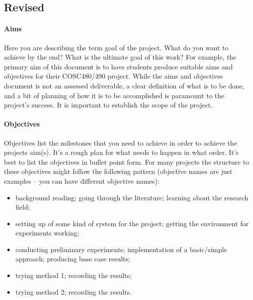 \documentclass[12pt]{article}
\begin{document}
\subsection*{Revised}

\paragraph{Aims}
Here you are describing the term goal of the project. What do you want to achieve by the end?  What is the ultimate goal of this work?  For example, the primary aim of this document is to have students produce suitable aims and objectives for their COSC480/490 project. While the aims and objectives document is not an assessed deliverable, a clear definition of what is to be done, and a bit of planning of how it is to be accomplished is paramount to the project's success. It is important to establish the scope of the project.

\paragraph{Objectives}
Objectives list the milestones that you need to achieve in order to achieve the projects aim(s). It's a rough plan for what needs to happen in what order. It's best to list the objectives in bullet point form. For many projects the structure to these objectives might follow the following pattern (objective names are just examples -- you can have different objective names):    
\begin{itemize}[noitemsep]
\item background reading; going through the literature; learning about the research field;
\item setting up of some kind of system for the project; getting the environment for experiments working;
\item conducting preliminary experiments; implementation of a basic/simple approach; producing base case results;
\item trying method 1; recording the results;
\item trying method 2; recording the results.
\end{itemize}

\end{document}
